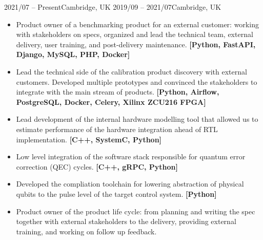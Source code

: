 \documentclass[10pt,a4paper,ragged2e,withhyper]{altacv}
\begin{document}
\begin{paracol}{2}


{2021/07 -- Present}{Cambridge, UK}
{2019/09 -- 2021/07}{Cambridge, UK}

\begin{itemize}

    \item
    Product owner of a benchmarking product for an external customer:
    working with stakeholders on specs, organized and lead the technical team,
    external delivery, user training, and post-delivery maintenance.
    {\bf [Python, FastAPI, Django, MySQL, PHP, Docker]}
    
    \item
    Lead the technical side of the calibration product discovery with external
    customers.
    Developed multiple prototypes and convinced the stakeholders to integrate
    with the main stream of products.
    {\bf [Python, Airflow, PostgreSQL, Docker, Celery, Xilinx ZCU216 FPGA]}
    
    \item
    Lead development of the internal hardware modelling tool that allowed us
    to estimate performance of the hardware integration ahead of RTL
    implementation.
    {\bf [C++, SystemC, Python]}

    \item
    Low level integration of the software stack responsible for quantum error
    correction (QEC) cycles.
    {\bf [C++, gRPC, Python]}
    
    \item
    Developed the compliation toolchain for lowering abstraction of physical
    qubits to the pulse level of the target control system.
    {\bf [Python]}
    
    \item
    Product owner of the product life cycle: from planning
    and writing the spec together with external stakeholders to the delivery,
    providing external training, and working on follow up feedback.
    

\end{itemize}
\end{paracol}
\end{document}
